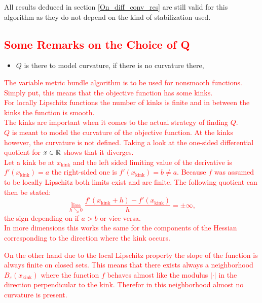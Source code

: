 \begin{remark}
	All results deduced in section \ref{On_diff_conv_res} are still valid for this algorithm as they do not depend on the kind of stabilization used.
\end{remark}

\subsection{\textcolor{red}{Some Remarks on the Choice of Q}}

\begin{itemize}
	\item \(Q\) is there to model curvature, if there is no curvature there, 
\end{itemize}

\textcolor{red}{The variable metric bundle algorithm is to be used for nonsmooth functions. Simply put, this means that the objective function has some kinks. \\
For locally Lipschitz functions the number of kinks is finite and in between the kinks the function is smooth. \\
The kinks are important when it comes to the actual strategy of finding \(Q\). \\
\(Q\) is meant to model the curvature of the objective function. At the kinks however, the curvature is not defined. Taking a look at the one-sided differential quotient for \(x \in \mathbb{R}\) shows that it diverges. \\
Let a kink be at \(x_{\text{kink}}\) and the left sided limiting value of the derivative is \(f'(x_{\text{kink}}) = a\) the right-sided one is \(f'(x_{\text{kink}}) = b \neq a\). Because \(f\) was assumed to be locally Lipschitz both limits exist and are finite.
The following quotient can then be stated:
\[ \lim_{h \searrow 0} \frac{f'(x_{\text{kink}}+h)-f'(x_{\text{kink}})}{h} = \pm \infty, \]
the sign depending on if \(a > b\) or vice versa. \\
In more dimensions this works the same for the components of the Hessian corresponding to the direction where the kink occurs.}

\textcolor{red}{On the other hand due to the local Lipschitz property the slope of the function is always finite on closed sets. This means that there exists always a neighborhood \(B_{\varepsilon}(x_{\text{kink}})\) where the function \(f\) behaves almost like the modulus \(|\cdot|\) in the direction perpendicular to the kink. Therefor in this neighborhood almost no curvature is present.}


